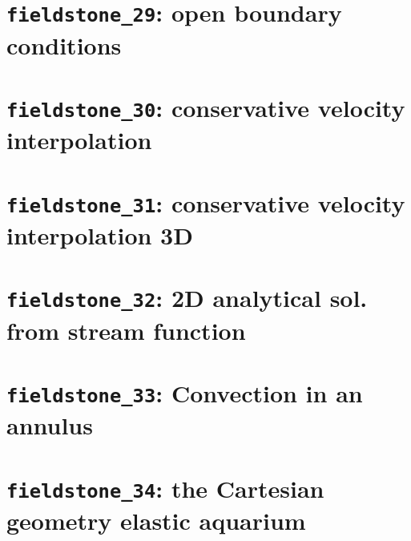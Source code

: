 \documentclass[a4paper]{article}
\begin{document}
\newpage %
\section{{\tt fieldstone\_29}: open boundary conditions \label{f29}} %

\newpage %
\section{{\tt fieldstone\_30}: conservative velocity interpolation \label{f30}} %

\newpage %
\section{{\tt fieldstone\_31}: conservative velocity interpolation 3D \label{f31}} %

\newpage %
\section{{\tt fieldstone\_32}: 2D analytical sol. from stream function \label{f32}} %

\newpage %
\section{{\tt fieldstone\_33}: Convection in an annulus \label{f33}} %

\newpage %
\section{{\tt fieldstone\_34}: the Cartesian geometry elastic aquarium \label{f34}} %
\end{document}
